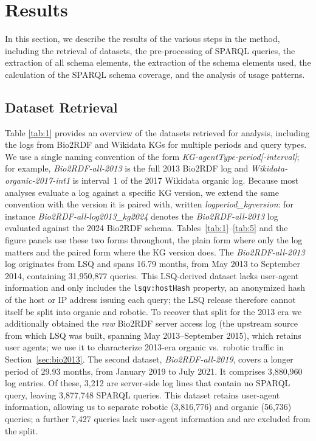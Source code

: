 \documentclass[sw]{iosart2x}
\begin{document}
\section{Results}\label{s4}
In this section, we describe the results of the various steps in the method, including the retrieval of datasets, the pre-processing of SPARQL queries, the extraction of all schema elements, the extraction of the schema elements used, the calculation of the SPARQL schema coverage, and the analysis of usage patterns.

\subsection{Dataset Retrieval }
Table \ref{tab:1} provides an overview of the datasets retrieved for analysis, including the logs from Bio2RDF and Wikidata KGs for multiple periods and query types. We use a single naming convention of the form \emph{KG-agentType-period[-interval]}; for example, \emph{Bio2RDF-all-2013} is the full 2013 Bio2RDF log and \emph{Wikidata-organic-2017-int1} is interval~1 of the 2017 Wikidata organic log. Because most analyses evaluate a log against a specific KG version, we extend the same convention with the version it is paired with, written \emph{log\textlangle period\textrangle\_kg\textlangle version\textrangle}: for instance \emph{Bio2RDF-all-log2013\_kg2024} denotes the \emph{Bio2RDF-all-2013} log evaluated against the 2024 Bio2RDF schema. Tables~\ref{tab:1}--\ref{tab:5} and the figure panels use these two forms throughout, the plain form where only the log matters and the paired form where the KG version does. The \emph{Bio2RDF-all-2013} log originates from LSQ and spans 16.79 months, from May 2013 to September 2014, containing 31,950,877 queries. This LSQ-derived dataset lacks user-agent information and only includes the \texttt{lsqv:hostHash} property, an anonymized hash of the host or IP address issuing each query; the LSQ release therefore cannot itself be split into organic and robotic. To recover that split for the 2013 era we additionally obtained the \emph{raw} Bio2RDF server access log (the upstream source from which LSQ was built, spanning May 2013--September 2015), which retains user agents; we use it to characterize 2013-era organic vs.\ robotic traffic in Section~\ref{sec:bio2013}. The second dataset, \emph{Bio2RDF-all-2019}, covers a longer period of 29.93 months, from January 2019 to July 2021. It comprises 3,880,960 log entries. Of these, 3,212 are server-side log lines that contain no SPARQL query, leaving 3,877,748 SPARQL queries. This dataset retains user-agent information, allowing us to separate robotic (3,816,776) and organic (56,736) queries; a further 7,427 queries lack user-agent information and are excluded from the split.
\end{document}
